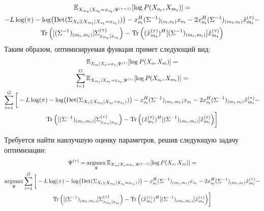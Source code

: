 \documentclass[11pt]{article}
\newcommand{\Expect}{\mathbb{E}}
\DeclareMathOperator*{\argmax}{argmax}
\DeclareMathOperator{\Det}{Det}
\begin{document}
\begin{equation*}
\begin{gathered}
\Expect_{X_{m_t}|X_{o_t}=x_{o_t}, \Psi^{(\tau-1)}}[\log P(X_{o_t}, X_{m_t})]=\\
-L \log(\pi) - \log (\Det(\Sigma_{X_t|(X_{m_t}|X_{o_t}=x_{o_t})})) - x_{o_t}^H (\Sigma^{-1})_{(o_t, o_t)}x_{o_t} - 2 x_{o_t}^H (\Sigma^{-1})_{(m_t, o_t)}\hat{x}_{m_t}^{(\tau)} - \\ \Tr \Big( [(\Sigma^{-1})_{(m_t, m_t)}]\Sigma^{(\tau)}_{x_{m_t}|x_{o_t}} \Big) - \Tr \Big((\hat{x}_{m_t}^{(\tau)})^H[(\Sigma^{-1})_{(m_t, m_t)}]\hat{x}_{m_t}^{(\tau)} \Big) 
\end{gathered}
\end{equation*}
Таким образом, оптимизируемая функция примет следующий вид:
\begin{equation*}
\begin{gathered}
 \Expect_{X_m|X_o=x_o, \Psi^{(\tau)}}[\log P(X_o, X_m)] = \\
 \sum_{t=1}^G\Expect_{X_{m_t}|X_{o_t}=x_{o_t}, \Psi^{(\tau)}}[\log P(X_{o_t}, X_{m_t})] = \\
\sum_{t=1}^G \bigg[-L \log(\pi) - \log (\Det(\Sigma_{X_t|(X_{m_t}|X_{o_t}=x_{o_t})})) - x_{o_t}^H (\Sigma^{-1})_{(m_t, m_t)}x_{o_t} - 2 x_{o_t}^H (\Sigma^{-1})_{(m_t, o_t)}\hat{x}_{m_t}^{(\tau)} - \\ \Tr \Big( [(\Sigma^{-1})_{(m_t, m_t)}]\Sigma^{(\tau)}_{x_{m_t}|x_{o_t}} \Big) - \Tr \Big((\hat{x}_{m_t}^{(\tau)})^H[(\Sigma^{-1})_{(m_t, m_t)}]\hat{x}_{m_t}^{(\tau)} \Big) \bigg]
\end{gathered}
\end{equation*}
\begin{center}
\fontsize{14}{18}\selectfont {}
\end{center}
Требуется найти наилучшую оценку параметров, решив следующую задачу оптимизации:
\begin{equation*}
\begin{gathered}
\Psi^{(\tau)}=\argmax_{\Psi} \Expect_{X_m|X_o=x_o, \Psi^{(\tau-1)}}[\log P(X_o, X_m)] =\\
\argmax_{\Psi} \sum_{t=1}^G \bigg[-L \log(\pi) - \log (\Det(\Sigma_{X_t|(X_{m_t}|X_{o_t}=x_{o_t})})) - x_{o_t}^H (\Sigma^{-1})_{(m_t, m_t)}x_{o_t} - 2 x_{o_t}^H (\Sigma^{-1})_{(m_t, o_t)}\hat{x}_{m_t}^{(\tau)} - \\ \Tr \Big( [(\Sigma^{-1})_{(m_t, m_t)}]\Sigma^{(\tau)}_{x_{m_t}|x_{o_t}} \Big) - \Tr \Big((\hat{x}_{m_t}^{(\tau)})^H[(\Sigma^{-1})_{(m_t, m_t)}]\hat{x}_{m_t}^{(\tau)} \Big) \bigg]
\end{gathered}
\end{equation*}
\end{document}
